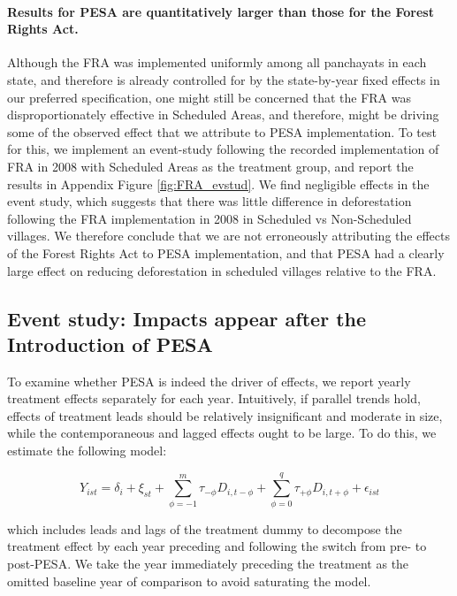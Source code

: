 \documentclass[12pt,reqno]{article}
\begin{document}
\paragraph*{Results for PESA are quantitatively larger than those for the Forest Rights Act.}
Although the FRA was implemented uniformly among all panchayats in each state, and therefore is already controlled for by the state-by-year fixed effects in our preferred specification, one might still be concerned that the FRA was disproportionately effective in Scheduled Areas, and therefore, might be driving some of the observed effect that we attribute to PESA implementation. To test for this, we implement an event-study following the recorded implementation of FRA in 2008 with Scheduled Areas as the treatment group, and report the results in Appendix Figure \ref{fig:FRA_evstud}. We find negligible effects in the event study, which suggests that there was little difference in deforestation following the FRA implementation in 2008 in Scheduled vs Non-Scheduled villages. We therefore conclude that we are not erroneously attributing the effects of the Forest Rights Act to PESA implementation, and that PESA had a clearly large effect on reducing deforestation in scheduled villages relative to the FRA.

\subsection{Event study: Impacts appear after the Introduction of PESA} %
\label{sub:dynamic_treatment_effects}

To examine whether PESA is indeed the driver of effects, we report yearly treatment effects separately for each year. Intuitively, if parallel trends hold, effects of treatment leads should be relatively insignificant and moderate in size, while the contemporaneous and lagged effects ought to be large. To do this, we estimate the following model:

\begin{equation}\label{granger}
 Y_{ist} = \delta_i + \xi_{st} +
\sum_{\phi=-1}^m \tau_{-\phi}
D_{i, t - \phi} + \sum_{\phi=0}^q \tau_{+\phi} D_{i,t+\phi}
+ \epsilon_{ist}   
\end{equation}

 which includes leads and lags of the treatment dummy to decompose the treatment effect by each year preceding and following the switch from pre- to post-PESA. We take the year immediately preceding the treatment as the omitted baseline year of comparison to avoid saturating the model.
 
\end{document}
